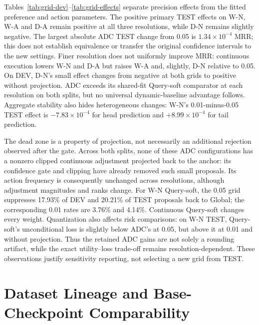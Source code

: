 \documentclass[11pt,a4paper]{article}
\begin{document}




Tables~\ref{tab:grid-dev}--\ref{tab:grid-effects} separate precision effects from the fitted preference and action parameters. The positive primary TEST effects on W-N, W-A and D-A remain positive at all three resolutions, while D-N remains slightly negative. The largest absolute ADC TEST change from 0.05 is $1.34\times10^{-4}$ MRR; this does not establish equivalence or transfer the original confidence intervals to the new settings. Finer resolution does not uniformly improve MRR: continuous execution lowers W-N and D-A but raises W-A and, slightly, D-N relative to 0.05. On DEV, D-N's small effect changes from negative at both grids to positive without projection. ADC exceeds its shared-fit Query-soft comparator at each resolution on both splits, but no universal dynamic-baseline advantage follows. Aggregate stability also hides heterogeneous changes: W-N's 0.01-minus-0.05 TEST effect is $-7.83\times10^{-4}$ for head prediction and $+8.99\times10^{-4}$ for tail prediction.

The dead zone is a property of projection, not necessarily an additional rejection observed after the gate. Across both splits, none of these ADC configurations has a nonzero clipped continuous adjustment projected back to the anchor: its confidence gate and clipping have already removed such small proposals. Its action frequency is consequently unchanged across resolutions, although adjustment magnitudes and ranks change. For W-N Query-soft, the 0.05 grid suppresses 17.93\% of DEV and 20.21\% of TEST proposals back to Global; the corresponding 0.01 rates are 3.76\% and 4.14\%. Continuous Query-soft changes every weight. Quantization also affects risk comparisons: on W-N TEST, Query-soft's unconditional loss is slightly below ADC's at 0.05, but above it at 0.01 and without projection. Thus the retained ADC gains are not solely a rounding artifact, while the exact utility--loss trade-off remains resolution-dependent. These observations justify sensitivity reporting, not selecting a new grid from TEST.

\section{Dataset Lineage and Base-Checkpoint Comparability}
\label{app:data-checkpoint}
\end{document}
